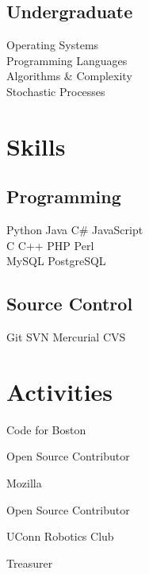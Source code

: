 \documentclass[]{deedy-resume}
\begin{document}
\begin{minipage}[t]{0.38\textwidth}
\subsection{Undergraduate}
Operating Systems \\
Programming Languages \\
Algorithms \& Complexity \\
Stochastic Processes


\section{Skills}
\subsection{Programming}
Python \textbullet{} Java \textbullet{} C\# \textbullet{} JavaScript \\
C \textbullet{} C++ \textbullet{} PHP \textbullet{} Perl \textbullet{} \\
MySQL \textbullet{} PostgreSQL
\sectionsep
\subsection{Source Control}
Git \textbullet{} SVN \textbullet{} Mercurial \textbullet{} CVS
\sectionsep


\section{Activities}
Code for Boston \\
\vspace{\topsep} %
\begin{tightemize}
\item Open Source Contributor
\end{tightemize}
Mozilla \\
\begin{tightemize}
\item Open Source Contributor
\end{tightemize}
UConn Robotics Club \\
\begin{tightemize}
\item Treasurer
\end{tightemize}
\sectionsep


\end{minipage}
\end{document}
